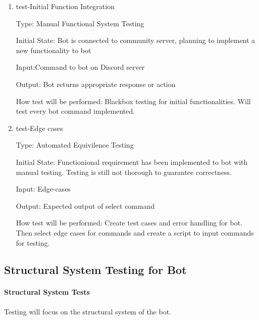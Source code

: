 \documentclass[12pt, titlepage]{article}
\begin{document}
\begin{enumerate}

\item{test-Initial Function Integration\\}

Type: Manual Functional System Testing
					
Initial State: Bot is connected to community server, planning to implement a new functionality to bot
					
Input:Command to bot on Discord server
					
Output: Bot returns appropriate response or action
					
How test will be performed: Blackbox testing for initial functionalities. Will test every bot command implemented.
					
\item{test-Edge cases\\}

Type: Automated Equivilence Testing
					
Initial State: Functionional requirement has been implemented to bot with manual testing. Testing is still not thorough to guarantee correctness.
					
Input: Edge-cases
					
Output: Expected output of select command
					
How test will be performed:  Create test cases and error handling for bot. Then select edge cases for commands and create a script to input commands for testing.

\end{enumerate}

\subsection{Structural System Testing for Bot}
		
\paragraph{Structural System Tests}
Testing will focus on the structural system of the bot.
\end{document}
